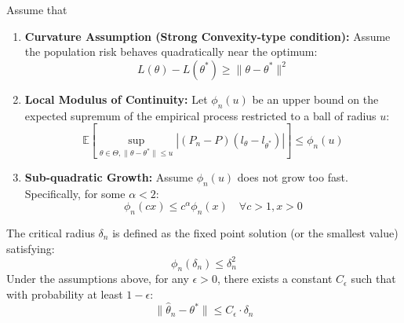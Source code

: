 \begin{thm}[Localization]
    Assume that
\begin{enumerate}
    \item \textbf{Curvature Assumption (Strong Convexity-type condition):}
    Assume the population risk behaves quadratically near the optimum:
    $$
    L(\theta) - L(\theta^*) \ge \|\theta - \theta^*\|^2
    $$
    
    \item \textbf{Local Modulus of Continuity:}
    Let $\phi_n(u)$ be an upper bound on the expected supremum of the empirical process restricted to a ball of radius $u$:
    $$
    \mathbb{E}\left[ \sup_{\theta \in \Theta, \|\theta - \theta^*\| \le u} \left| (P_n - P)(l_\theta - l_{\theta^*}) \right| \right] \le \phi_n(u)
    $$
    
    \item \textbf{Sub-quadratic Growth:}
    Assume $\phi_n(u)$ does not grow too fast. Specifically, for some $\alpha < 2$:
    $$
    \phi_n(cx) \le c^\alpha \phi_n(x) \quad \forall c > 1, x > 0
    $$
\end{enumerate}
The critical radius $\delta_n$ is defined as the fixed point solution (or the smallest value) satisfying:
$$
\phi_n(\delta_n) \le \delta_n^2
$$
Under the assumptions above, for any $\epsilon > 0$, there exists a constant $C_\epsilon$ such that with probability at least $1-\epsilon$:
$$
\|\hat{\theta}_n - \theta^*\| \le C_\epsilon \cdot \delta_n
$$
\end{thm}

